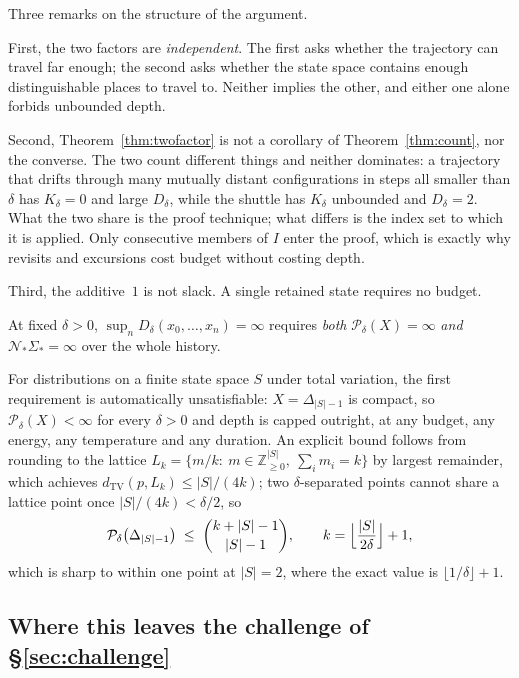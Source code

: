 Three remarks on the structure of the argument.

First, the two factors are \emph{independent}. The first asks whether the trajectory
can travel far enough; the second asks whether the state space contains enough
distinguishable places to travel to. Neither implies the other, and either one alone
forbids unbounded depth.

Second, Theorem~\ref{thm:twofactor} is not a corollary of Theorem~\ref{thm:count},
nor the converse. The two count different things and neither dominates: a trajectory
that drifts through many mutually distant configurations in steps all smaller than
$\delta$ has $K_\delta=0$ and large $D_\delta$, while the shuttle has $K_\delta$
unbounded and $D_\delta=2$. What the two share is the proof technique; what differs
is the index set to which it is applied. Only consecutive members of $I$ enter the
proof, which is exactly why revisits and excursions cost budget without costing
depth.

Third, the additive~$1$ is not slack. A single retained state requires no budget.

\begin{corollary}
\label{cor:unbounded}
At fixed $\delta>0$, $\sup_n D_\delta(x_0,\dots,x_n)=\infty$ requires \emph{both}
$\mathcal{P}_\delta(X)=\infty$ \emph{and} $\mathcal{N}_*\Sigma_*=\infty$ over the
whole history.
\end{corollary}

For distributions on a finite state space $S$ under total variation, the first
requirement is automatically unsatisfiable: $X=\Delta_{|S|-1}$ is compact, so
$\mathcal{P}_\delta(X)<\infty$ for every $\delta>0$ and depth is capped outright, at
any budget, any energy, any temperature and any duration. An explicit bound follows
from rounding to the lattice $L_k=\{m/k:\ m\in\mathbb{Z}_{\ge0}^{|S|},\ \sum_i m_i=k\}$
by largest remainder, which achieves $d_{\mathrm{TV}}(p,L_k)\le|S|/(4k)$; two
$\delta$-separated points cannot share a lattice point once $|S|/(4k)<\delta/2$, so
\begin{equation}
\label{eq:packingub}
  \mathcal{P}_\delta\bigl(\Delta_{|S|-1}\bigr)
  \;\le\; \binom{k+|S|-1}{|S|-1},
  \qquad k=\Bigl\lfloor \frac{|S|}{2\delta}\Bigr\rfloor+1 ,
\end{equation}
which is sharp to within one point at $|S|=2$, where the exact value is
$\lfloor1/\delta\rfloor+1$.

\subsection{Where this leaves the challenge of \S\ref{sec:challenge}}


